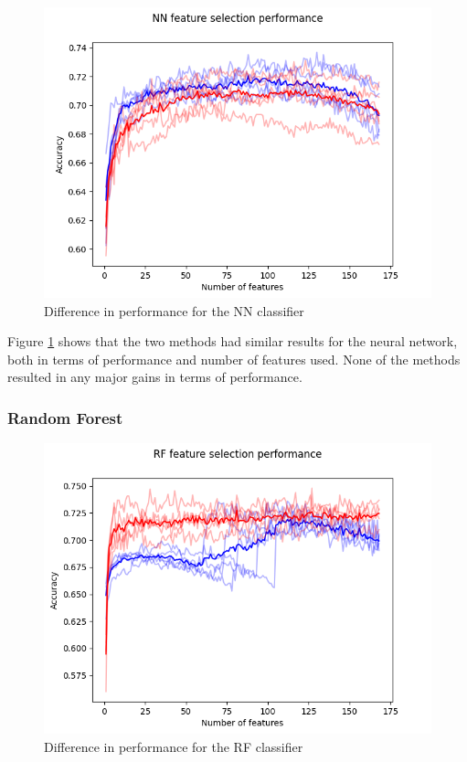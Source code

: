 \documentclass{kththesis}
\begin{document}
\begin{figure}[h!]
  \begin{center}
    \includegraphics[scale=0.8]{../new_plots/nn_graph.png}
    \caption{Difference in performance for the NN classifier}
    \label{fig:nn}  %
  \end{center}
\end{figure}

Figure \ref{fig:nn} shows that the two methods had similar results for the neural network, both in terms of performance and number of features used. None of the methods resulted in any major gains in terms of performance.

\newpage

\subsubsection{Random Forest}

\begin{figure}[h!]
  \begin{center}
    \includegraphics[scale=0.8]{../new_plots/rf_graph.png}
    \caption{Difference in performance for the RF classifier}
  \end{center}
\end{figure}
\end{document}
